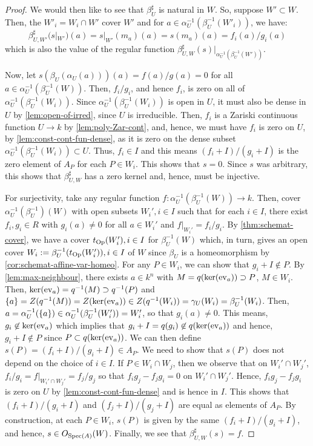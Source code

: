 \begin{proof}
We would then like to see that $\beta_U^\sharp$ is natural in $W$.
So, suppose $W' \subset W$. Then, the $W'_i = W_i \cap W'$
cover $W'$ and for $a \in \alpha_U^{-1}(\beta_U^{-1}(W'_i))$, we have:
\[
\beta_{U, W'}^\sharp(s|_{W'})(a) = s|_{W'}(m_a)(a) = s(m_a)(a)
= f_i(a)/g_i(a)
\]
which is also the value of the regular function
$\beta_{U, W}^\sharp(s)|_{\alpha_U^{-1}(\beta_U^{-1}(W'))}$.

Now, let $s(\beta_U(\alpha_U(a)))(a) = f(a)/g(a) = 0$ for
all $a \in \alpha_U^{-1}(\beta_U^{-1}(W))$. Then, $f_i/g_i$, and hence
$f_i$, is zero on all of $\alpha_U^{-1}(\beta_U^{-1}(W_i))$.
Since $\alpha_U^{-1}(\beta_U^{-1}(W_i))$ is open in $U$, it must also
be dense in $U$ by \cref{lem:open-of-irred}, since $U$ is irreducible.
Then, $f_i$ is a Zariski continuous function $U \to k$ by
\cref{lem:poly-Zar-cont}, and, hence, we must have
$f_i$ is zero on $U$, by \cref{lem:const-cont-fun-dense},
as it is zero on the dense subset
$\alpha_U^{-1}(\beta_U^{-1}(W_i)) \subset U$.
Thus, $f_i \in I$ and this means $(f_i + I)/(g_i + I)$
is the zero element of $A_P$ for each $P \in W_i$.
This shows that $s = 0$. Since $s$ was arbitrary, this shows that
$\beta^\sharp_{U, W}$ has a zero kernel and, hence, must be injective.

For surjectivity, take any regular function
$f : \alpha_U^{-1}(\beta_U^{-1}(W)) \to k$. Then, cover
$\alpha_U^{-1}(\beta_U^{-1})(W)$ with open subsets
$W_i', i \in I$ such that for each $i \in I$, there exist
$f_i, g_i \in R$ with $g_i(a) \neq 0$ for all $a \in W_i'$ and
$f|_{W_i'} = f_i/g_i$. By \cref{thm:schemat-cover}, we
have a cover $t_{\mathrm{Op}}(W_i'), i \in I$ for $\beta_U^{-1}(W)$
which, in turn, gives an open cover
$W_i := \beta_U^{-1}(t_{\mathrm{Op}}(W_i')), i \in I$
of $W$ since $\beta_U$ is a homeomorphism by
\cref{cor:schemat-affine-var-homeo}. For any $P \in W_i$, we
can show that $g_i + I \not\in P$. By \cref{lem:max-neighbour}, there exists
$a \in k^n$ with $M = q(\ker{\ev_a}) \supset P$, $M \in W_i$.
Then, $\ker{\ev_a} = q^{-1}(M) \supset q^{-1}(P)$ and
$\set{a} = Z(q^{-1}(M)) = Z(\ker{\ev_a}) \in Z(q^{-1}(W_i))
= \gamma_U(W_i) = \beta_U^{-1}(W_i)$. Then,
$a = \alpha_U^{-1}(\set{a}) \in \alpha_U^{-1}(\beta_U^{-1}(W_i'))
= W_i'$, so that $g_i(a) \neq 0$. This means, $g_i \not\in \ker{\ev_a}$
which implies that $g_i + I = q(g_i) \not\in q(\ker{\ev_a})$ and hence,
$g_i + I \not\in P$ since $P \subset q(\ker{\ev_a})$. We can then define
$s(P) = (f_i + I)/(g_i + I) \in A_P$. We need to show that $s(P)$
does not depend on the choice of $i \in I$. If $P \in W_i \cap W_j$,
then we observe that on $W_i' \cap W_j'$,
$f_i/g_i = f|_{W_i' \cap W_j'} = f_j/g_j$ so that $f_ig_j - f_jg_i = 0$
on $W_i' \cap W_j'$. Hence, $f_ig_j - f_jg_i$ is zero on $U$ by
\cref{lem:const-cont-fun-dense} and is hence in $I$. This shows
that $(f_i + I)/(g_i + I)$ and $(f_j + I)/(g_j + I)$ are equal as
elements of $A_P$.
By construction, at each $P \in W_i$,
$s(P)$ is given by the same $(f_i + I)/(g_i + I)$, and hence,
$s \in O_{\mathrm{Spec}(A)}(W)$. Finally, we see that
$\beta^\sharp_{U, W}(s) = f$.


\end{proof}
